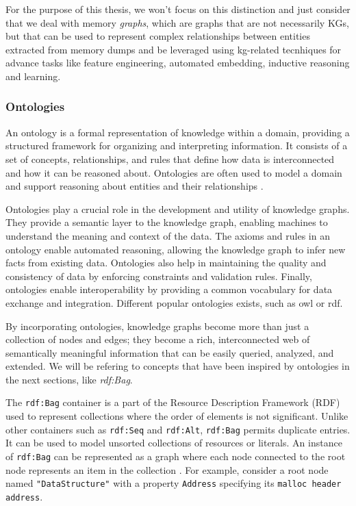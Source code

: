     For the purpose of this thesis, we won't focus on this distinction and just consider that we deal with memory \textit{graphs}, which are graphs that are not necessarily KGs, but that can be used to represent complex relationships between entities extracted from memory dumps and be leveraged using \acrshort{kg}-related tecnhiques for advance tasks like feature engineering, automated embedding, inductive reasoning and learning.

    \subsubsection{Ontologies}\label{sec:background:ontology}
    An ontology is a formal representation of knowledge within a domain, providing a structured framework for organizing and interpreting information. It consists of a set of concepts, relationships, and rules that define how data is interconnected and how it can be reasoned about. Ontologies are often used to model a domain and support reasoning about entities and their relationships \cite{KG22}.

    Ontologies play a crucial role in the development and utility of knowledge graphs. They provide a semantic layer to the knowledge graph, enabling machines to understand the meaning and context of the data. The axioms and rules in an ontology enable automated reasoning, allowing the knowledge graph to infer new facts from existing data. Ontologies also help in maintaining the quality and consistency of data by enforcing constraints and validation rules. Finally, ontologies enable interoperability by providing a common vocabulary for data exchange and integration. Different popular ontologies exists, such as \acrfull{owl} or \acrfull{rdf}.

    By incorporating ontologies, knowledge graphs become more than just a collection of nodes and edges; they become a rich, interconnected web of semantically meaningful information that can be easily queried, analyzed, and extended. We will be refering to concepts that have been inspired by ontologies in the next sections, like \textit{rdf:Bag}.

    The \texttt{rdf:Bag} container is a part of the Resource Description Framework (RDF) used to represent collections where the order of elements is not significant. Unlike other containers such as \texttt{rdf:Seq} and \texttt{rdf:Alt}, \texttt{rdf:Bag} permits duplicate entries. It can be used to model unsorted collections of resources or literals. An instance of \texttt{rdf:Bag} can be represented as a graph where each node connected to the root node represents an item in the collection \cite{OrderedDataInRDF20}. For example, consider a root node named \texttt{"DataStructure"} with a property \texttt{Address} specifying its \texttt{malloc header address}.

